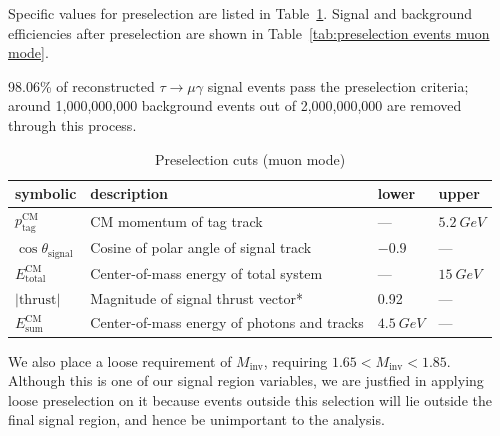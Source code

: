 \documentclass[12pt]{thesis}  %
\begin{document}
Specific values for preselection are listed in Table~\ref{tab:preselection cuts muon mode}. Signal and background efficiencies after preselection are shown in Table~\ref{tab:preselection events muon mode}.

98.06\% of reconstructed $\tau\to\mu\gamma$ signal events pass the preselection criteria; around 1,000,000,000 background events out of 2,000,000,000 are removed through this process. 

\begin{table}[h]
\centering
\begin{tabular}{llll}
\textbf{symbolic} & \textbf{description} & \textbf{lower} & \textbf{upper} \\ \hline
$p_{\text{tag}}^{\text{CM}}$  & CM momentum of tag track & --- & $\SI{5.2}{GeV}$ \\
$\cos\theta_{\text{signal}}$ & Cosine of polar angle of signal track & $-0.9$ & --- \\
$E_{\text{total}}^{\text{CM}}$ & Center-of-mass energy of total system  & --- & $\SI{15}{GeV}$ \\
$\lvert\text{thrust}\rvert$ & Magnitude of signal thrust vector* & 0.92 & --- \\
$E_{\text{sum}}^{\text{CM}}$ & Center-of-mass energy of photons and tracks & $\SI{4.5}{GeV}$ & ---
\end{tabular}
\caption{Preselection cuts (muon mode)}
\label{tab:preselection cuts muon mode}
\end{table}

We also place a loose requirement of $M_{\text{inv}}$, requiring $1.65 < M_{\text{inv}} < 1.85$. Although this is one of our signal region variables, we are justfied in applying loose preselection on it because events outside this selection will lie outside the final signal region, and hence be unimportant to the analysis.
\end{document}
